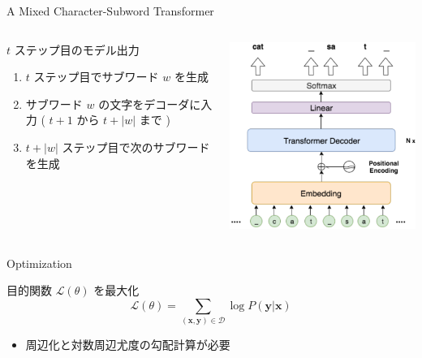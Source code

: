 \documentclass[unicode, 12pt, aspectratio=43]{beamer}
\begin{document}
\begin{frame}[label={sec:org8076e1e}]{A Mixed Character-Subword Transformer}
\begin{columns}
\begin{column}{0.65\columnwidth}
\begin{block}{\(t\) ステップ目のモデル出力}
\begin{enumerate}
\item \(t\) ステップ目でサブワード \(w\) を生成
\item サブワード \(w\) の文字をデコーダに入力 ( \(t+1\) から \(t+|w|\) まで )
\item \(t+|w|\) ステップ目で次のサブワードを生成
\end{enumerate}
\end{block}
\end{column}

\begin{column}{0.35\columnwidth}
\begin{center}
\includegraphics[width=\linewidth]{./figure/Figure2.pdf}
\end{center}
\end{column}
\end{columns}
\end{frame}

\begin{frame}[label={sec:orgfdbf3ff}]{Optimization}
\begin{block}{目的関数 \(\mathcal{L}(\theta)\) を最大化}
\begin{equation*}
  \mathcal{L}(\theta) = \sum_{(\boldsymbol{x}, \boldsymbol{y}) \in \mathcal{D}} \log P(\boldsymbol{y} | \boldsymbol{x})
\end{equation*}
\begin{itemize}
\item 周辺化と対数周辺尤度の勾配計算が必要
\end{itemize}
\end{block}
\end{frame}
\end{document}
